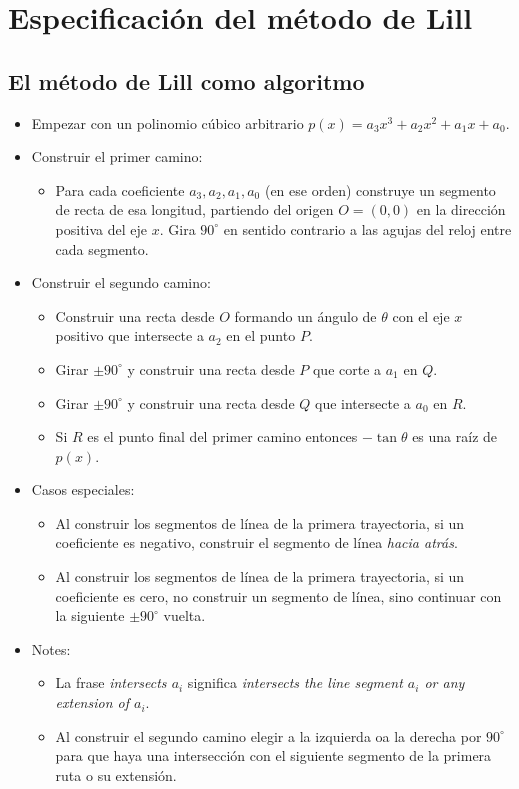\section{Especificación del método de Lill}\label{s.method}

\subsection{El método de Lill como algoritmo}
\begin{itemize}
\item Empezar con un polinomio cúbico arbitrario $p(x)=a_3x^3+a_2x^2+a_1x+a_0$.
\item Construir el primer camino:
\begin{itemize}
\item Para cada coeficiente $a_3,a_2,a_1,a_0$ (en ese orden) construye un segmento de recta de esa longitud, partiendo del origen $O=(0,0)$ en la dirección positiva del eje $x$. Gira $90^\circ$ en sentido contrario a las agujas del reloj entre cada segmento.
\end{itemize}
\item Construir el segundo camino:
\begin{itemize}
\item Construir una recta desde $O$ formando un ángulo de $\theta$ con el eje $x$ positivo que intersecte a $a_2$ en el punto $P$.
\item Girar $\pm 90^\circ$ y construir una recta desde $P$ que corte a $a_1$ en $Q$.
\item Girar $\pm 90^\circ$ y construir una recta desde $Q$ que intersecte a $a_0$ en $R$.
\item Si $R$ es el punto final del primer camino entonces $-\tan\theta$ es una raíz de $p(x)$.
\end{itemize}
\item Casos especiales:
\begin{itemize}
\item Al construir los segmentos de línea de la primera trayectoria, si un coeficiente es negativo, construir el segmento de línea \emph{hacia atrás}.
\item Al construir los segmentos de línea de la primera trayectoria, si un coeficiente es cero, no construir un segmento de línea, sino continuar con la siguiente $\pm 90^\circ$ vuelta.
\end{itemize}
\item Notes:
\begin{itemize}
\item La frase \emph{intersects $a_i$} significa \emph{intersects the line segment $a_i$ or any extension of $a_i$}.
\item Al construir el segundo camino elegir a la izquierda oa la derecha por $90^\circ$ para que haya una intersección con el siguiente segmento de la primera ruta o su extensión.
\end{itemize}
\end{itemize}

